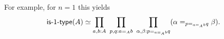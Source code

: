 For example, for $n = 1$ this yields
\begin{equation*}
\mathsf{is}\mbox{-}{1}\mbox{-}\mathsf{type}(A) \simeq \prod_{a, b : A} ~ \prod_{p, q : a =_A b}
	~ \prod_{\alpha, \beta : p =_{a =_A b} q} (\alpha =_{p =_{a =_A b} q} \beta) \text{.}
\end{equation*}



